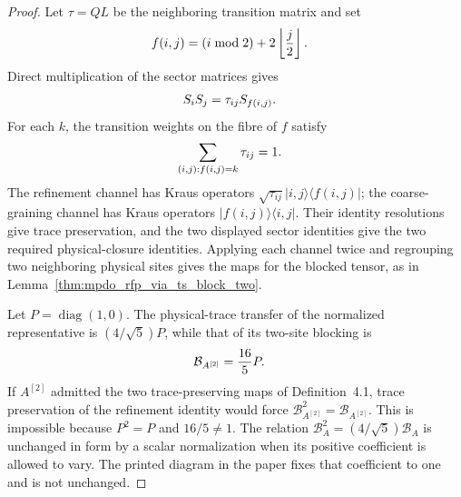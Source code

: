 \begin{proof}
    \leanok
    Let $\tau=QL$ be the neighboring transition matrix and set
    \begin{align}
        f(i,j) & =(i\bmod 2)+2\left\lfloor\frac j2\right\rfloor. \notag
    \end{align}
    Direct multiplication of the sector matrices gives
    \begin{align}
        S_iS_j & =\tau_{ij}S_{f(i,j)}. \notag
    \end{align}
    For each $k$, the transition weights on the fibre of $f$ satisfy
    \begin{align}
        \sum_{(i,j):f(i,j)=k}\tau_{ij} & =1. \notag
    \end{align}
    The refinement channel has Kraus operators
    $\sqrt{\tau_{ij}}\lvert i,j\rangle\langle f(i,j)\rvert$; the
    coarse-graining channel has Kraus operators
    $\lvert f(i,j)\rangle\langle i,j\rvert$. Their identity resolutions give
    trace preservation, and the two displayed sector identities give the two
    required physical-closure identities. Applying each channel twice and
    regrouping two neighboring physical sites gives the maps for the blocked
    tensor, as in
    Lemma~\ref{thm:mpdo_rfp_via_ts_block_two}.

    Let $P=\operatorname{diag}(1,0)$. The physical-trace transfer of the
    normalized representative is $(4/\sqrt5)P$, while that of its two-site
    blocking is
    \begin{align}
        \mathcal B_{A^{[2]}} & =\frac{16}{5}P. \notag
    \end{align}
    If $A^{[2]}$ admitted the two trace-preserving maps of Definition~4.1,
    trace preservation of the refinement identity would force
    $\mathcal B_{A^{[2]}}^2=\mathcal B_{A^{[2]}}$. This is impossible because
    $P^2=P$ and $16/5\ne1$. The relation
    $\mathcal B_A^2=(4/\sqrt5)\mathcal B_A$ is unchanged in form by a scalar
    normalization when its positive coefficient is allowed to vary. The
    printed diagram in the paper fixes that coefficient to one and is not
    unchanged.
\end{proof}

